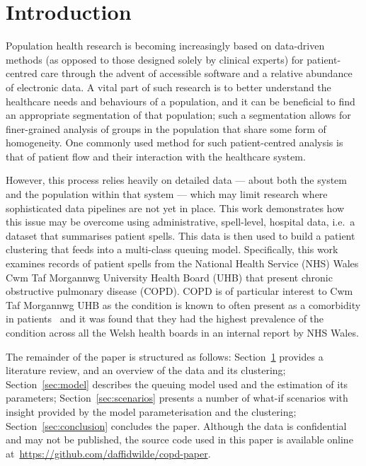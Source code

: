 \section{Introduction}\label{sec:intro}

Population health research is becoming increasingly based on data-driven methods
(as opposed to those designed solely by clinical experts) for patient-centred
care through the advent of accessible software and a relative abundance of
electronic data. A vital part of such research is to better understand the
healthcare needs and behaviours of a population, and it can be beneficial to
find an appropriate segmentation of that population; such a segmentation allows
for finer-grained analysis of groups in the population that share some form of
homogeneity. One commonly used method for such patient-centred analysis is that
of patient flow and their interaction with the healthcare system.

However, this process relies heavily on detailed data --- about both the system
and the population within that system --- which may limit research where
sophisticated data pipelines are not yet in place. This work demonstrates how
this issue may be overcome using administrative, spell-level, hospital data,
i.e.\ a dataset that summarises patient spells. This data is then used to build
a patient clustering that feeds into a multi-class queuing model. Specifically,
this work examines records of patient spells from the National Health Service
(NHS) Wales Cwm Taf Morgannwg University Health Board (UHB) that present chronic
obstructive pulmonary disease (COPD).  COPD is of particular interest to Cwm Taf
Morgannwg UHB as the condition is known to often present as a comorbidity in
patients~\cite{Houben2019} and it was found that they had the highest prevalence
of the condition across all the Welsh health boards in an internal report by NHS
Wales.



The remainder of the paper is structured as follows: Section~\ref{sec:intro}
provides a literature review, and an overview of the data and its clustering;
Section~\ref{sec:model} describes the queuing model used and the estimation of
its parameters; Section~\ref{sec:scenarios} presents a number of what-if
scenarios with insight provided by the model parameterisation and the
clustering; Section~\ref{sec:conclusion} concludes the paper. Although the data
is confidential and may not be published, the source code used in this paper is
available online at~\url{https://github.com/daffidwilde/copd-paper}.

